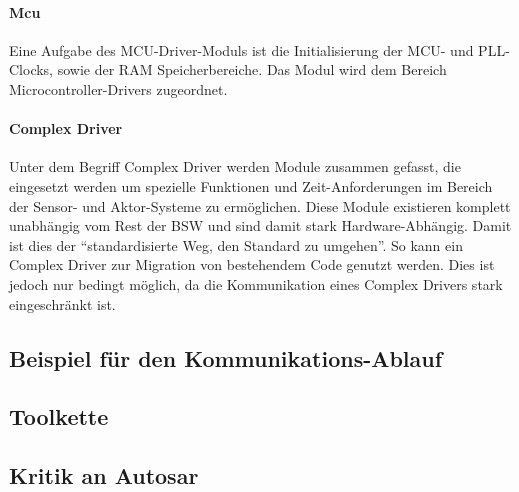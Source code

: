 \documentclass[
  a4paper,					    %
  twoside,
  DIV=calc,     				%
  bibliography=totoc,
  cleardoublepage=empty,
  ngerman,     					%
  final       					%
]{scrbook}
\begin{document}
\paragraph{Mcu}
Eine Aufgabe des MCU-Driver-Moduls ist die Initialisierung der MCU- und PLL-Clocks, sowie der RAM Speicherbereiche. Das Modul wird dem Bereich Microcontroller-Drivers zugeordnet.


\paragraph{Complex Driver}
Unter dem Begriff Complex Driver werden Module zusammen gefasst, die eingesetzt werden um spezielle Funktionen und Zeit-Anforderungen im Bereich der Sensor- und Aktor-Systeme zu ermöglichen. Diese Module existieren komplett unabhängig vom Rest der BSW und sind damit stark Hardware-Abhängig. Damit ist dies der "`standardisierte Weg, den Standard zu umgehen"'\cite[Seite 227]{SE_Autosar}. So kann ein Complex Driver zur Migration von bestehendem Code genutzt werden. Dies ist jedoch nur bedingt möglich, da die Kommunikation eines Complex Drivers stark eingeschränkt ist.




\subsection{Beispiel für den Kommunikations-Ablauf}
\label{sec:beispiel_komm}



\subsection{Toolkette}
\label{sec:Toolkette}





\subsection{Kritik an Autosar}
\label{sec:kritik_autosar}
\end{document}
